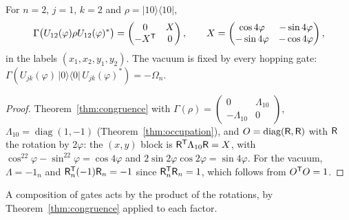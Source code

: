 \begin{corollary}\label{cor:gate-example}
For $n=2$, $j=1$, $k=2$ and $\rho=|10\rangle\langle10|$,
\[
 \Gamma\bigl(U_{12}(\varphi)\rho U_{12}(\varphi)^*\bigr)
 =\begin{pmatrix}0&X\\-X^{\mathsf T}&0\end{pmatrix},\qquad
 X=\begin{pmatrix}\cos4\varphi&-\sin4\varphi\\-\sin4\varphi&-\cos4\varphi\end{pmatrix},
\]
in the labels $(x_1,x_2,y_1,y_2)$. The vacuum is fixed by every hopping gate:
$\Gamma(U_{jk}(\varphi)\,|0\rangle\langle0|\,U_{jk}(\varphi)^*)=-\Omega_n$.
\end{corollary}
\begin{proof}
Theorem~\ref{thm:congruence} with $\Gamma(\rho)=\begin{pmatrix}0&\Lambda_{10}\\-\Lambda_{10}&0\end{pmatrix}$,
$\Lambda_{10}=\operatorname{diag}(1,-1)$ (Theorem~\ref{thm:occupation}), and $O=\operatorname{diag}(\mathsf R,\mathsf R)$
with $\mathsf R$ the rotation by $2\varphi$: the $(x,y)$ block is $\mathsf R^{\mathsf T}\Lambda_{10}\mathsf R=X$, with
$\cos^22\varphi-\sin^22\varphi=\cos4\varphi$ and $2\sin2\varphi\cos2\varphi=\sin4\varphi$. For
the vacuum, $\Lambda=-1_n$ and $\mathsf R_n^{\mathsf T}(-1)\mathsf R_n=-1$ since $\mathsf R_n^{\mathsf T}\mathsf R_n=1$, which follows from
$O^{\mathsf T}O=1$.
\end{proof}
A composition of gates acts by the product of the rotations, by
Theorem~\ref{thm:congruence} applied to each factor.
